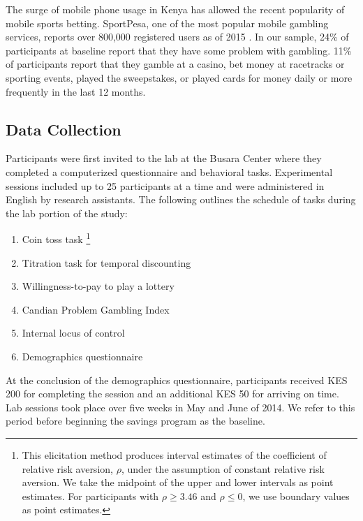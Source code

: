 \documentclass[11pt]{article}
\begin{document}
		The surge of mobile phone usage in Kenya has allowed the recent popularity of mobile sports betting. SportPesa, one of the most popular mobile gambling services, reports over 800,000 registered users as of 2015 \parencite{kemibaro_sportpesa_2015}. In our sample, 24\% of participants at baseline report that they have some problem with gambling. 11\% of participants report that they gamble at a casino, bet money at racetracks or sporting events, played the sweepstakes, or played cards for money daily or more frequently in the last 12 months.


	\subsection{Data Collection}

		Participants were first invited to the lab at the Busara Center where they completed a computerized questionnaire and behavioral tasks. Experimental sessions included up to 25 participants at a time and were administered in English by research assistants. The following outlines the schedule of tasks during the lab portion of the study:

		\begin{enumerate} \setlength{\itemsep}{1pt}
		\item Coin toss task \parencite{eckel_sex_2002}\footnote{This elicitation method produces interval estimates of the coefficient of relative risk aversion, $\rho$, under the assumption of constant relative risk aversion. We take the midpoint of the upper and lower intervals as point estimates. For participants with $\rho \geq 3.46$ and $\rho \leq 0$, we use boundary values as point estimates.}
		\item Titration task for temporal discounting \parencite{cornsweet_staircase-method_1962}
		\item Willingness-to-pay to play a lottery
		\item Candian Problem Gambling Index \parencite{ferris_canadian_2001}
		\item Internal locus of control \parencite{rotter_generalized_1966}
		\item Demographics questionnaire
		\end{enumerate}

		At the conclusion of the demographics questionnaire, participants received KES 200 for completing the session and an additional KES 50 for arriving on time. Lab sessions took place over five weeks in May and June of 2014. We refer to this period before beginning the savings program as the baseline.
\end{document}
